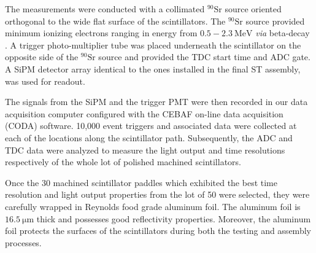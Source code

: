 The measurements were conducted with a collimated $\mathrm{^{90}Sr}$ source oriented orthogonal to the wide flat surface of the scintillators.  The $\mathrm{^{90}Sr}$ source provided minimum ionizing electrons ranging in energy from $\mathrm{0.5-2.3~MeV}$ \textit{via} beta-decay \cite{nndc_sr90}\cite{nndc_y90}.  A trigger photo-multiplier tube was placed underneath the scintillator on the opposite side of the $\mathrm{^{90}Sr}$ source and provided the TDC start time and ADC gate.  A SiPM detector array 
identical to the ones installed in the final ST assembly, was used for readout.  

The signals from the SiPM and the trigger PMT were then recorded in our data acquisition computer configured with the CEBAF on-line data acquisition (CODA) software.  10,000 event triggers and associated data were collected at each of the locations along the scintillator path.  Subsequently, the ADC and TDC data were analyzed to measure the light output and time resolutions respectively of the whole lot of polished machined scintillators.  

Once the 30 machined scintillator paddles which exhibited the best time resolution and light output properties from the lot of 50 were selected, they were carefully wrapped in Reynolds food grade aluminum foil.  The aluminum foil is $\mathrm{16.5~\mu m}$ thick and possesses good reflectivity properties.  Moreover, the aluminum foil protects the surfaces of the scintillators during both the testing and assembly processes.
  
